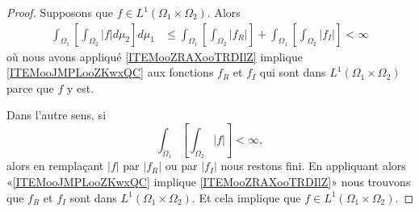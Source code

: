 \begin{proof}
    Supposons que \( f\in L^1(\Omega_1\times \Omega_2)\). Alors
    \begin{subequations}
        \begin{align}
            \int_{\Omega_1}\left[ \int_{\Omega_2}| f |d\mu_2 \right]d\mu_1&\leq \int_{\Omega_1}\left[ \int_{\Omega_2}| f_R | \right]+\int_{\Omega_1}\left[ \int_{\Omega_2}| f_I | \right]<\infty
        \end{align}
    \end{subequations}
    où nous avons appliqué \ref{ITEMooZRAXooTRDIlZ} implique \ref{ITEMooJMPLooZKwxQC} aux fonctions \( f_R\) et \( f_I\) qui sont dans \( L^1(\Omega_1\times \Omega_2)\) parce que \( f\) y est.

    Dans l'autre sens, si
    \begin{equation}
        \int_{\Omega_1}\left[ \int_{\Omega_2}| f | \right]<\infty,
    \end{equation}
    alors en remplaçant \( | f |\) par \( | f_R |\) ou par \( | f_I |\) nous restons fini. En appliquant alors «\ref{ITEMooJMPLooZKwxQC} implique \ref{ITEMooZRAXooTRDIlZ}» nous trouvons que \( f_R\) et \( f_I\) sont dans \( L^1(\Omega_1\times \Omega_2)\). Et cela implique que \( f\in L^1(\Omega_1\times \Omega_2)\).
\end{proof}

